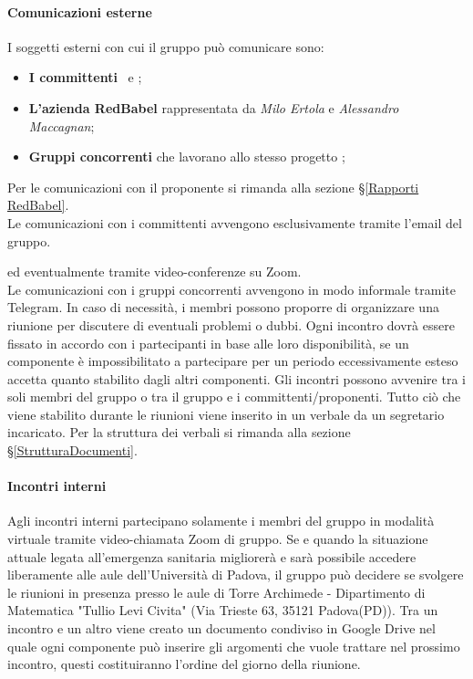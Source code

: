 \paragraph*{Comunicazioni esterne}
I soggetti esterni con cui il gruppo può comunicare sono: 
\begin{itemize}
	\item \textbf{I committenti} \VT\ e \CR;
	\item \textbf{L'azienda RedBabel} rappresentata da \textit{Milo Ertola} e \textit{Alessandro Maccagnan};
	\item \textbf{Gruppi concorrenti} che lavorano allo stesso progetto \NomeProgetto;
\end{itemize}
Per le comunicazioni con il proponente si rimanda alla sezione \S\ref{Rapporti RedBabel}.\\
Le comunicazioni con i committenti avvengono esclusivamente tramite l'email del gruppo.
\begin{center}
	 \textbf{\Mail} 
\end{center} ed eventualmente tramite video-conferenze su Zoom.\\
Le comunicazioni con i gruppi concorrenti avvengono in modo informale tramite Telegram.
In caso di necessità, i membri possono proporre di organizzare una riunione per discutere di eventuali problemi o dubbi. Ogni incontro dovrà essere fissato in accordo con i partecipanti in base alle loro disponibilità, se un componente è impossibilitato a partecipare per un periodo eccessivamente esteso accetta quanto stabilito dagli altri componenti. Gli incontri possono avvenire tra i soli membri del gruppo o tra il gruppo e i committenti/proponenti. 
Tutto ciò che viene stabilito durante le riunioni viene inserito in un verbale da un segretario incaricato. Per la struttura dei verbali si rimanda alla sezione \S\ref{StrutturaDocumenti}.
\paragraph*{Incontri interni}
Agli incontri interni partecipano solamente i membri del gruppo in modalità virtuale tramite video-chiamata Zoom di gruppo.
Se e quando la situazione attuale legata all'emergenza sanitaria migliorerà e sarà possibile accedere liberamente alle aule dell'Università di Padova, il gruppo può decidere se svolgere le riunioni in presenza presso le aule di Torre Archimede - Dipartimento di Matematica "Tullio Levi Civita" (Via Trieste 63, 35121 Padova(PD)).
Tra un incontro e un altro viene creato un documento condiviso in Google Drive nel quale ogni componente può inserire gli argomenti che vuole trattare nel prossimo incontro, questi costituiranno l'ordine del giorno della riunione.
